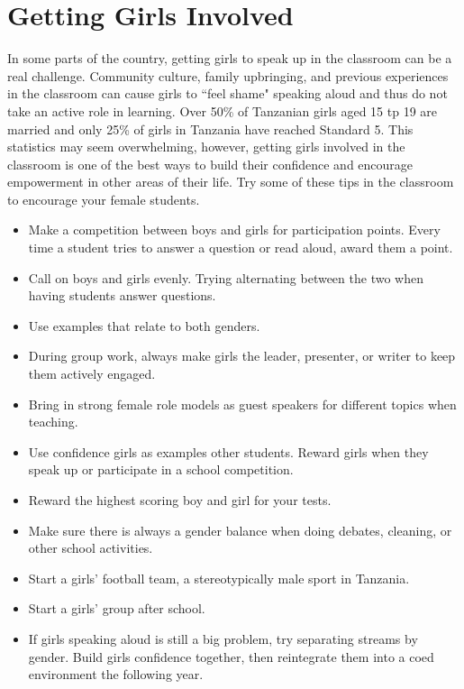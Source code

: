 \chapter{Getting Girls Involved}
In some parts of the country, getting girls to speak up in the classroom can be a real challenge.  Community culture, family upbringing, and previous experiences in the classroom can cause girls to ``feel shame" speaking aloud and thus do not take an active role in learning.  Over 50\% of Tanzanian girls aged 15 tp 19 are married and only 25\% of girls in Tanzania have reached Standard 5. This statistics may seem overwhelming, however, getting girls involved in the classroom is one of the best ways to build their confidence and encourage empowerment in other areas of their life.  Try some of these tips in the classroom to encourage your female students.

\begin{itemize}
 \item Make a competition between boys and girls for participation points.  Every time a student tries to answer a question or read aloud, award them a point.  
 \item Call on boys and girls evenly.  Trying alternating between the two when having students answer questions.
 \item Use examples that relate to both genders.
 \item During group work, always make girls the leader, presenter, or writer to keep them actively engaged.
 \item Bring in strong female role models as guest speakers for different topics when teaching.
 \item Use confidence girls as examples other students. Reward girls when they speak up or participate in a school competition.
 \item Reward the highest scoring boy and girl for your tests.
 \item Make sure there is always a gender balance when doing debates, cleaning, or other school activities.
 \item Start a girls' football team, a stereotypically male sport in Tanzania.
 \item Start a girls' group after school.
 \item If girls speaking aloud is still a big problem, try separating streams by gender.  Build girls confidence together, then reintegrate them into a coed environment the following year.  
\end{itemize}

\begin{center}
\setlength\fboxsep{0pt}
\setlength\fboxrule{2pt}
\end{center}